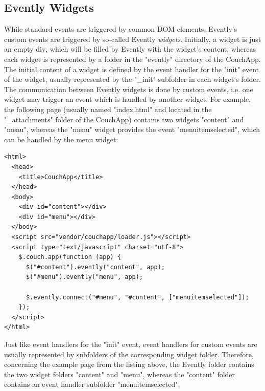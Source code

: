 \subsection{Evently Widgets}
\label{couchapp:evently:widgets}
While standard events are triggered by common DOM elements, Evently's custom events are triggered by so-called Evently \emph{widgets}. Initially, a widget is just an empty div, which will be filled by Evently with the widget's content, whereas each widget is represented by a folder in the "evently" directory of the CouchApp. The initial content of a widget is defined by the event handler for the "init" event of the widget, usually represented by the "\_init" subfolder in each widget's folder.\\
The communication between Evently widgets is done by custom events, i.e. one widget may trigger an event which is handled by another widget. For example, the following page (usually named "index.html" and located in the "\_attachments" folder of the CouchApp) contains two widgets "content" and "menu", whereas the "menu" widget provides the event "menuitemselected", which can be handled by the menu widget:
\begin{lstlisting}
<html>
  <head>
    <title>CouchApp</title>
  </head>
  <body>
    <div id="content"></div>
    <div id="menu"></div>
  </body>
  <script src="vendor/couchapp/loader.js"></script>
  <script type="text/javascript" charset="utf-8">
    $.couch.app(function (app) {
      $("#content").evently("content", app);
      $("#menu").evently("menu", app);

      $.evently.connect("#menu", "#content", ["menuitemselected"]);
    });
  </script>
</html>
\end{lstlisting}
Just like event handlers for the "init" event, event handlers for custom events are usually represented by subfolders of the corresponding widget folder. Therefore, concerning the example page from the listing above, the Evently folder contains the two widget folders "content" and "menu", whereas the "content" folder contains an event handler subfolder "menuitemselected". 

